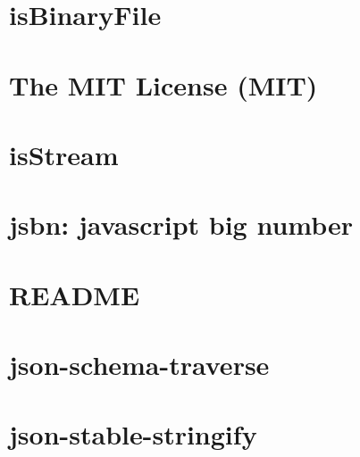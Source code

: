 \documentclass[twoside]{book}
\newcommand{\+}{\discretionary{\mbox{\scriptsize$\hookleftarrow$}}{}{}}
\begin{document}
\chapter{is\+Binary\+File}
\label{md_dsmacc_examples_DRmerge_node_modules_isbinaryfile_README}

\chapter{The M\+IT License (M\+IT)}
\label{md_dsmacc_examples_DRmerge_node_modules_isstream_LICENSE}

\chapter{is\+Stream}
\label{md_dsmacc_examples_DRmerge_node_modules_isstream_README}

\chapter{jsbn\+: javascript big number}
\label{md_dsmacc_examples_DRmerge_node_modules_jsbn_README}

\chapter{R\+E\+A\+D\+ME}
\label{md_dsmacc_examples_DRmerge_node_modules_json-schema_README}

\chapter{json-\/schema-\/traverse}
\label{md_dsmacc_examples_DRmerge_node_modules_json-schema-traverse_README}

\chapter{json-\/stable-\/stringify}
\label{md_dsmacc_examples_DRmerge_node_modules_json-stable-stringify_readme}

\end{document}
